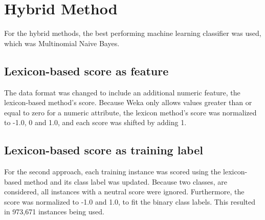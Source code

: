 \section{Hybrid Method}
For the hybrid methods, the best performing machine learning classifier was used, which was Multinomial Naive Bayes.

\subsection{Lexicon-based score as feature}
The data format was changed to include an additional numeric feature, the lexicon-based method's score. Because Weka only allows values greater than or equal to zero for a numeric attribute, the lexicon method's score was normalized to -1.0, 0 and 1.0, and each score was shifted by adding 1.

\subsection{Lexicon-based score as training label}
For the second approach, each training instance was scored using the lexicon-based method and its class label was updated. Because two classes, are considered, all instances with a neutral score were ignored. Furthermore, the score was normalized to -1.0 and 1.0, to fit the binary class labels. This resulted in 973,671 instances being used.



